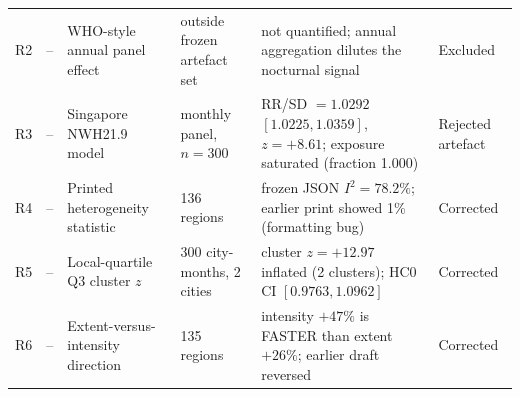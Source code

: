 \begin{table}[p]
\begin{tabular}{rllp{2.6cm}p{4.6cm}l}
R2 & -- & WHO-style annual panel effect & outside frozen artefact set & not quantified; annual aggregation dilutes the nocturnal signal & Excluded \\
R3 & -- & Singapore NWH21.9 model & monthly panel, $n=300$ & RR/SD $=1.0292$ $[1.0225,1.0359]$, $z=+8.61$; exposure saturated (fraction 1.000) & Rejected artefact \\
R4 & -- & Printed heterogeneity statistic & 136 regions & frozen JSON $I^2=78.2\%$; earlier print showed 1\% (formatting bug) & Corrected \\
R5 & -- & Local-quartile Q3 cluster $z$ & 300 city-months, 2 cities & cluster $z=+12.97$ inflated (2 clusters); HC0 CI $[0.9763,1.0962]$ & Corrected \\
R6 & -- & Extent-versus-intensity direction & 135 regions & intensity $+47\%$ is FASTER than extent $+26\%$; earlier draft reversed & Corrected \\
\bottomrule
\end{tabular}
\end{table}
\clearpage

